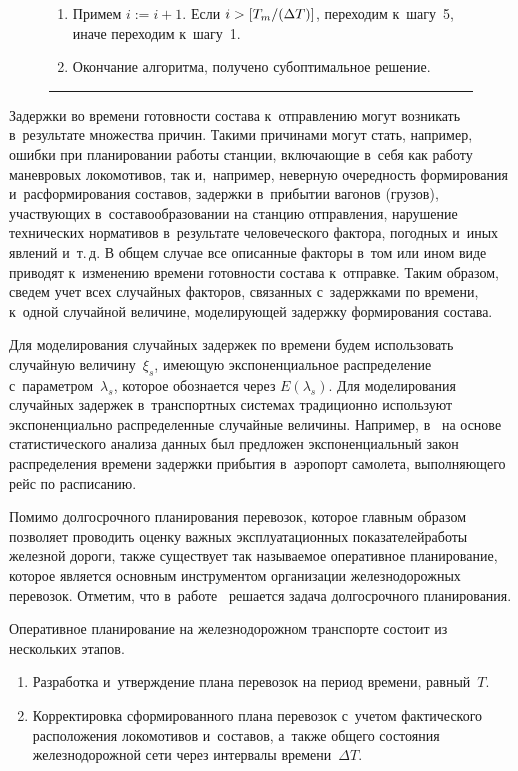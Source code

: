 \begin{multicols}{2}
\begin{figure*}[b]
\begin{enumerate}[1.]
        \item
        Примем $i := i+1$. Если $i \hm> [T_m/({\Delta T})]$, переходим к~шагу~5, 
        иначе переходим к~шагу~1.

        \item
        Окончание алгоритма, получено субоптимальное решение.
    \end{enumerate}
    \hrule
\end{figure*}


Задержки во времени готовности состава к~отправлению могут возникать в~результате 
множества причин.
Такими причинами могут стать, например, ошибки при планировании работы станции, 
включающие в~себя как работу маневровых локомотивов,
так и,~например, неверную очередность формирования и~расформирования составов, 
задержки в~прибытии вагонов (грузов),
участвующих в~составообразовании на станцию отправления, нарушение технических 
нормативов в~результате человеческого фактора,
погодных и~иных явлений и~т.\,д. В общем случае все описанные факторы в~том или 
ином виде приводят к~изменению времени
готовности состава к~отправке. Таким образом, сведем учет всех случайных факторов,
связанных с~задержками по времени, к~одной случайной величине, моделирующей 
задержку формирования состава.
{

}

Для моделирования случайных задержек по времени будем использовать 
случайную величину~$\xi_s$,
имеющую экспоненциальное распределение с~параметром~$\lambda_s$, 
которое обознается через $E(\lambda_s)$.
Для моделирования случайных задержек в~транспортных системах 
традиционно используют экспоненциально распределенные случайные величины. 
Например, в~\cite{KibzunNaumovUlanov} на основе статистического анализа данных 
был предложен экспоненциальный закон распределения времени задержки 
прибытия в~аэропорт самолета, выполняющего рейс по расписанию.

Помимо долгосрочного планирования перевозок, которое главным образом 
позволяет проводить оценку важных эксплуатационных
показателей\linebreak ра\-бо\-ты железной дороги, также существует так называемое 
оперативное планирование, которое является основным инструментом 
организации железнодорожных перевозок. Отметим, что в~работе~\cite{AzanovBuyanov} 
решается задача долгосрочного пла\-ни\-ро\-вания. 
{

}

Оперативное планирование 
на железнодорожном транспорте состоит из нескольких этапов. %
\begin{enumerate}[1.]
    \item
    Разработка и~утверждение плана перевозок на период времени, равный~$T$. %
    \item
    Корректировка сформированного плана перевозок с~учетом фактического расположения 
    локомотивов и~составов,
    а~также общего состояния железнодорожной сети через интервалы времени~$\Delta T$.
\end{enumerate}


\end{multicols}
